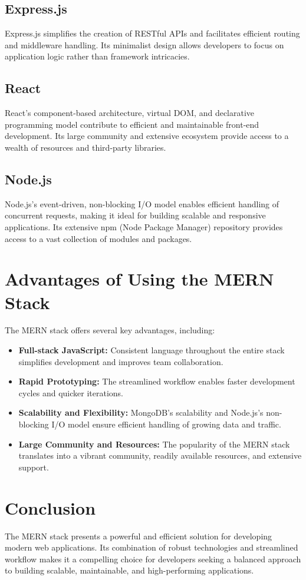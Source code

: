 \documentclass{article}
\begin{document}
\subsection{Express.js}
Express.js simplifies the creation of RESTful APIs and facilitates efficient routing and middleware handling.  Its minimalist design allows developers to focus on application logic rather than framework intricacies.

\subsection{React}
React's component-based architecture, virtual DOM, and declarative programming model contribute to efficient and maintainable front-end development.  Its large community and extensive ecosystem provide access to a wealth of resources and third-party libraries.

\subsection{Node.js}
Node.js's event-driven, non-blocking I/O model enables efficient handling of concurrent requests, making it ideal for building scalable and responsive applications.  Its extensive npm (Node Package Manager) repository provides access to a vast collection of modules and packages.

\section{Advantages of Using the MERN Stack}

The MERN stack offers several key advantages, including:

\begin{itemize}
    \item \textbf{Full-stack JavaScript:} Consistent language throughout the entire stack simplifies development and improves team collaboration.
    \item \textbf{Rapid Prototyping:} The streamlined workflow enables faster development cycles and quicker iterations.
    \item \textbf{Scalability and Flexibility:}  MongoDB's scalability and Node.js's non-blocking I/O model ensure efficient handling of growing data and traffic.
    \item \textbf{Large Community and Resources:}  The popularity of the MERN stack translates into a vibrant community, readily available resources, and extensive support.
\end{itemize}

\section{Conclusion}

The MERN stack presents a powerful and efficient solution for developing modern web applications.  Its combination of robust technologies and streamlined workflow makes it a compelling choice for developers seeking a balanced approach to building scalable, maintainable, and high-performing applications.
\end{document}
